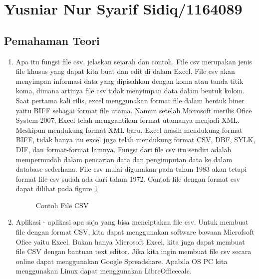 \section{Yusniar Nur Syarif Sidiq/1164089}
\subsection{Pemahaman Teori}

\begin{enumerate}

\item Apa itu fungsi file csv, jelaskan sejarah dan contoh.
	\subitem File csv merupakan jenis file khusus yang dapat kita buat dan edit di dalam Excel. File csv akan menyimpan informasi data yang dipisahkan dengan koma atau tanda titik koma, dimana artinya file csv tidak menyimpan data dalam bentuk kolom. Saat pertama kali rilis, excel menggunakan format file dalam bentuk biner yaitu BIFF sebagai format file utama. Namun setelah Microsoft merilis Ofice System 2007, Excel telah menggantikan format utamanya menjadi XML. Meskipun mendukung format XML baru, Excel masih mendukung format BIFF, tidak hanya itu excel juga telah mendukung format CSV, DBF, SYLK, DIF, dan format-format lainnya. Fungsi dari file csv itu sendiri adalah mempermudah dalam pencarian data dan pengimputan data ke dalam database sederhana. File csv mulai digunakan pada tahun 1983 akan tetapi format file csv sudah ada dari tahun 1972. Contoh file dengan format csv dapat dilihat pada figure \ref{YNCSV1}

	\begin{figure}[ht]
		\caption{Contoh File CSV}
		\label{YNCSV1}
	\end{figure}

\item Aplikasi - aplikasi apa saja yang bisa menciptakan file csv.
	\subitem Untuk membuat file dengan format CSV, kita dapat menggunakan software bawaan Microfsoft Ofice yaitu Excel. Bukan hanya Microsoft Excel, kita juga dapat membuat file CSV dengan bantuan text editor. Jika kita ingin membuat file csv secara online dapat menggunakan Google Spreadshare. Apabila OS PC kita menggunakan Linux dapat menggunakan LibreOfficecalc.


\end{enumerate}
